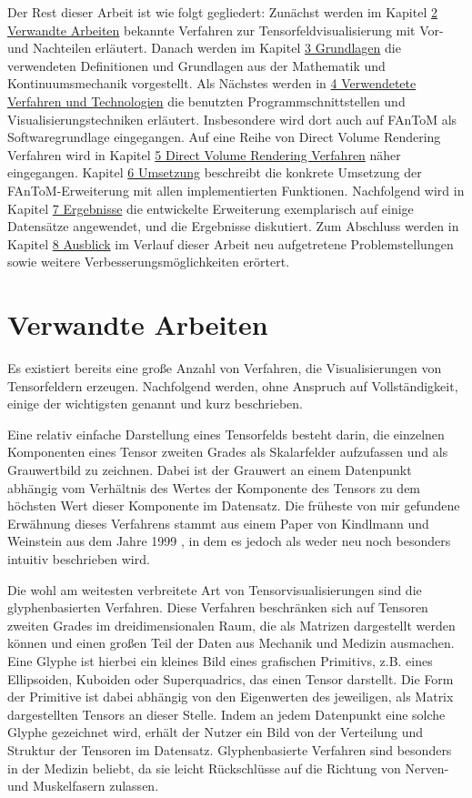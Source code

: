\documentclass[a4paper,fontsize=12pt,toc=bib,halfparskip]{scrartcl}
\begin{document}
Der Rest dieser Arbeit ist wie folgt gegliedert: Zun\"achst werden im Kapitel \hyperref[sec:Verwandte]{2 Verwandte Arbeiten} bekannte Verfahren zur Tensorfeldvisualisierung mit Vor- und Nachteilen erl\"autert. Danach werden im Kapitel \hyperref[sec:Grundlagen]{3 Grundlagen} die verwendeten Definitionen und Grundlagen aus der Mathematik und Kontinuumsmechanik vorgestellt. Als N\"achstes werden in \hyperref[sec:Technologien]{4 Verwendetete Verfahren und Technologien} die benutzten Programmschnittstellen und Visualisierungstechniken erl\"autert. Insbesondere wird dort auch auf FAnToM als Softwaregrundlage eingegangen. Auf eine Reihe von Direct Volume Rendering Verfahren wird in Kapitel \hyperref[sec:DVR]{5 Direct Volume Rendering Verfahren} n\"aher eingegangen. Kapitel \hyperref[sec:Umsetzung]{6 Umsetzung} beschreibt die konkrete Umsetzung der FAnToM-Erweiterung mit allen implementierten Funktionen. Nachfolgend wird in Kapitel \hyperref[sec:Ergebnisse]{7 Ergebnisse} die entwickelte Erweiterung exemplarisch auf einige Datens\"atze angewendet, und die Ergebnisse diskutiert. Zum Abschluss werden in Kapitel \hyperref[sec:Ausblick]{8 Ausblick} im Verlauf dieser Arbeit neu aufgetretene Problemstellungen sowie weitere Verbesserungsm\"oglichkeiten er\"ortert.
 
\section{Verwandte Arbeiten}
\label{sec:Verwandte}
Es existiert bereits eine gro{\ss}e Anzahl von Verfahren, die Visualisierungen von Tensorfeldern erzeugen. Nachfolgend werden, ohne Anspruch auf Vollst\"andigkeit, einige der wichtigsten genannt und kurz beschrieben.

Eine relativ einfache Darstellung eines Tensorfelds besteht darin, die einzelnen Komponenten eines Tensor zweiten Grades als Skalarfelder aufzufassen und als Grauwertbild zu zeichnen. Dabei ist der Grauwert an einem Datenpunkt abh\"angig vom Verh\"altnis des Wertes der Komponente des Tensors zu dem h\"ochsten Wert dieser Komponente im Datensatz. Die fr\"uheste von mir gefundene Erw\"ahnung dieses Verfahrens stammt aus einem Paper von Kindlmann und Weinstein aus dem Jahre 1999 \cite{kindlmann1999hue}, in dem es jedoch als weder neu noch besonders intuitiv beschrieben wird. 

Die wohl am weitesten verbreitete Art von Tensorvisualisierungen sind die glyphenbasierten Verfahren. Diese Verfahren beschr\"anken sich auf Tensoren zweiten Grades im dreidimensionalen Raum, die als Matrizen dargestellt werden k\"onnen und einen gro{\ss}en Teil der Daten aus Mechanik und Medizin ausmachen. Eine Glyphe ist hierbei ein kleines Bild eines grafischen Primitivs, z.B. eines Ellipsoiden, Kuboiden oder Superquadrics\cite{kindlmann2004superquadric}, das einen Tensor darstellt. Die Form der Primitive ist dabei abh\"angig von den Eigenwerten des jeweiligen, als Matrix dargestellten Tensors an dieser Stelle. Indem an jedem Datenpunkt eine solche Glyphe gezeichnet wird, erh\"alt der Nutzer ein Bild von der Verteilung und Struktur der Tensoren im Datensatz. Glyphenbasierte Verfahren sind besonders in der Medizin beliebt, da sie leicht R\"uckschl\"usse auf die Richtung von Nerven- und Muskelfasern zulassen.
\end{document}
